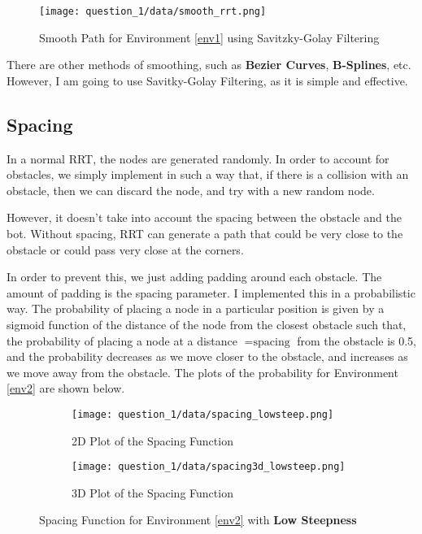 \documentclass[12pt]{report}
\begin{document}
\begin{figure}[H]
    \centering
    \texttt{[image: question\_1/data/smooth\_rrt.png]}
    \caption{Smooth Path for Environment \ref{env1} using Savitzky-Golay Filtering}
\end{figure}

There are other methods of smoothing, such as \textbf{Bezier Curves}, \textbf{B-Splines}, etc. However, I am going to use Savitky-Golay Filtering, as it is simple and effective.

\subsection{Spacing}

In a normal RRT, the nodes are generated randomly. In order to account for obstacles, we simply implement in such a way that, if there is a collision with an obstacle, then we can discard the node, and try with a new random node.

However, it doesn't take into account the spacing between the obstacle and the bot. Without spacing, RRT can generate a path that could be very close to the obstacle or could pass very close at the corners.

In order to prevent this, we just adding padding around each obstacle. The amount of padding is the spacing parameter. I implemented this in a probabilistic way. The probability of placing a node in a particular position is given by a sigmoid function of the distance of the node from the closest obstacle such that, the probability of placing a node at a distance $ = \text{spacing}$ from the obstacle is 0.5, and the probability decreases as we move closer to the obstacle, and increases as we move away from the obstacle. The plots of the probability for Environment \ref{env2} are shown below.

\begin{figure}[H]
    \centering
    \begin{subfigure}{0.4\textwidth}
        \texttt{[image: question\_1/data/spacing\_lowsteep.png]}
        \caption{2D Plot of the Spacing Function}
    \end{subfigure}
    \begin{subfigure}{0.4\textwidth}
        \texttt{[image: question\_1/data/spacing3d\_lowsteep.png]}
        \caption{3D Plot of the Spacing Function}
    \end{subfigure}
    \caption{Spacing Function for Environment \ref{env2} with \textbf{Low Steepness}}
\end{figure}
\end{document}
